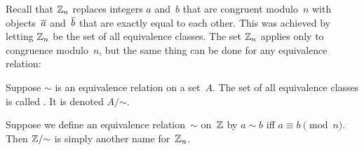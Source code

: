 Recall that $\mathbb{Z}_n$ replaces integers $a$ and~$b$ that are congruent modulo~$n$ with objects~$\overline{a}$ and~$\overline{b}$ that are exactly equal to each other. This was achieved by letting $\mathbb{Z}_n$ be the set of all equivalence classes. The set $\mathbb{Z}_n$ applies only to congruence modulo~$n$, but the same thing can be done for any equivalence relation:

\begin{defn} \label{moduloRelation}
Suppose $\sim$ is an equivalence relation on a set~$A$. The set of all equivalence classes is called . It is denoted $A/\mathord{\sim}$.
\end{defn}

\begin{example}{}
Suppose we define an equivalence relation~$\sim$ on~$\mathbb{Z}$ by $a \sim b$ iff $a \equiv b \pmod{n}$. Then $\mathbb{Z}/\mathord{\sim}$ is simply another name for~$\mathbb{Z}_n$.
\end{example}


%
%
%

